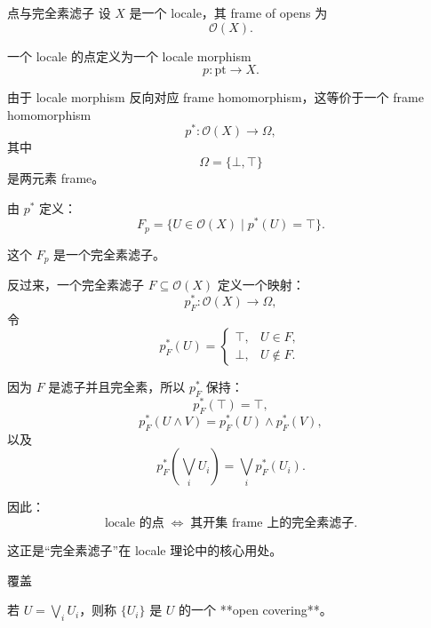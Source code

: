 \documentclass{beamer}
\begin{document}
\begin{frame}{点与完全素滤子}
设 $X$ 是一个 locale，其 frame of opens 为
\[
\mathcal O(X).
\]

一个 locale 的点定义为一个 locale morphism
\[
p:\mathrm{pt}\to X.
\]

由于 locale morphism 反向对应 frame homomorphism，这等价于一个 frame homomorphism
\[
p^\ast:\mathcal O(X)\to\Omega,
\]
其中
\[
\Omega=\{\bot,\top\}
\]
是两元素 frame。

由 $p^\ast$ 定义：
\[
F_p =
\{U\in\mathcal O(X)\mid p^\ast(U)=\top\}.
\]

这个 $F_p$ 是一个完全素滤子。

反过来，一个完全素滤子 $F\subseteq\mathcal O(X)$ 定义一个映射：
\[
p_F^\ast:\mathcal O(X)\to\Omega,
\]
令
\[
p_F^\ast(U)=
\begin{cases}
\top,&U\in F,\\
\bot,&U\notin F.
\end{cases}
\]

因为 $F$ 是滤子并且完全素，所以 $p_F^\ast$ 保持：
\[
p_F^\ast(\top)=\top,
\]
\[
p_F^\ast(U\wedge V)
=
p_F^\ast(U)\wedge p_F^\ast(V),
\]
以及
\[
p_F^\ast\left(\bigvee_i U_i\right)
=
\bigvee_i p_F^\ast(U_i).
\]

因此：
\[
\boxed{
\text{locale 的点}
\;\Longleftrightarrow\;
\text{其开集 frame 上的完全素滤子}.
}
\]

这正是“完全素滤子”在 locale 理论中的核心用处。
\end{frame}

\begin{frame}[fragile]{覆盖}
\begin{markdown}
若 $U=\bigvee_i U_i$，则称 $\{U_i\}$ 是 $U$ 的一个 **open covering**。
\end{markdown}
\end{frame}
\end{document}
